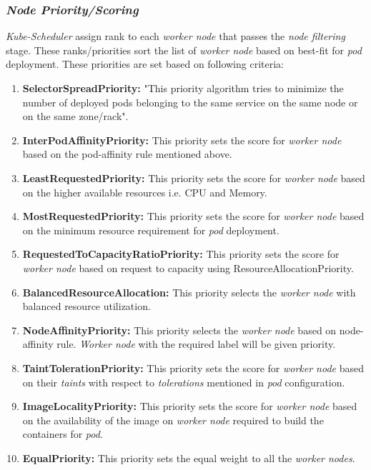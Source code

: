 \subsubsection{\emph{Node Priority/Scoring}}
\label{sec:node-priority}
\emph{Kube-Scheduler} assign rank to each \emph{worker node} that passes the \emph{node filtering} stage. These ranks/priorities sort the list of \emph{worker node} based on best-fit for \emph{pod} deployment. These priorities are set based on following criteria\cite{k8s}:
\begin{enumerate}
  \item \textbf{SelectorSpreadPriority:} "This priority algorithm tries to minimize the number of deployed pods belonging to the same service on the same node or on the same zone/rack"\cite{Santos2019}.
  \item \textbf{InterPodAffinityPriority:} This priority sets the score for \emph{worker node} based on the pod-affinity rule mentioned above.
  \item \textbf{LeastRequestedPriority:} This priority sets the score for \emph{worker node} based on the higher available resources i.e. CPU and Memory.
  \item \textbf{MostRequestedPriority:} This priority sets the score for \emph{worker node} based on the minimum resource requirement for \emph{pod} deployment.
  \item \textbf{RequestedToCapacityRatioPriority:} This priority sets the score for \emph{worker node} based on request to capacity using ResourceAllocationPriority.
  \item \textbf{BalancedResourceAllocation:} This priority selects the \emph{worker node} with balanced resource utilization.
  \item \textbf{NodeAffinityPriority:} This priority selects the \emph{worker node} based on node-affinity rule. \emph{Worker node} with the required label will be given priority.
  \item \textbf{TaintTolerationPriority:} This priority sets the score for \emph{worker node} based on their \emph{taints} with respect to \emph{tolerations} mentioned in \emph{pod} configuration\cite{Santos2019}.
  \item \textbf{ImageLocalityPriority:} This priority sets the score for \emph{worker node} based on the availability of the image on \emph{worker node} required to build the containers for \emph{pod}.
  \item \textbf{EqualPriority:} This priority sets the equal weight to all the \emph{worker nodes}.
\end{enumerate}
